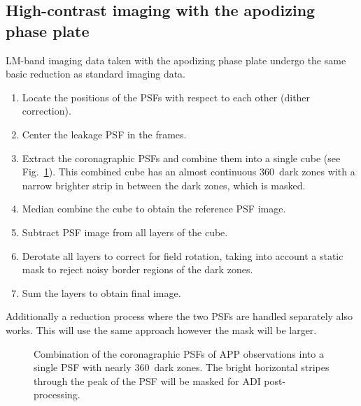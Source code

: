 \subsection{High-contrast imaging with the apodizing phase plate}
\label{ssec:algo_app_imaging}

LM-band imaging data taken with the apodizing phase plate undergo the
same basic reduction as standard imaging data. %



\begin{enumerate}
\item Locate the positions of the PSFs with respect to each other
  (dither correction).
\item Center the leakage PSF in the frames.
\item Extract the coronagraphic PSFs and combine them into a single
  cube (see Fig.~\ref{fig:app_psf_combine}). This combined cube has an almost continuous 
  360\degr\ dark zones with a narrow brighter strip in between the dark zones, which is masked.
\item Median combine the cube to obtain the reference PSF image.
\item Subtract PSF image from all layers of the cube.
\item Derotate all layers to correct for field rotation, taking into
  account a static mask to reject noisy border regions of the dark
  zones.
\item Sum the layers to obtain final image.
\end{enumerate}

Additionally a reduction process where the two PSFs are handled separately also works. This will use the same approach however the mask will be larger.

\begin{figure}
  \centering
    \caption[Combination of the coronagraphic PSFs of APP observations into a single PSF]{%
        Combination of the coronagraphic PSFs of APP observations
        into a single PSF with nearly 360\degr\ dark zones. The bright
        horizontal stripes through the peak of the PSF will be masked for
        ADI post-processing.}
  \label{fig:app_psf_combine}
\end{figure}

